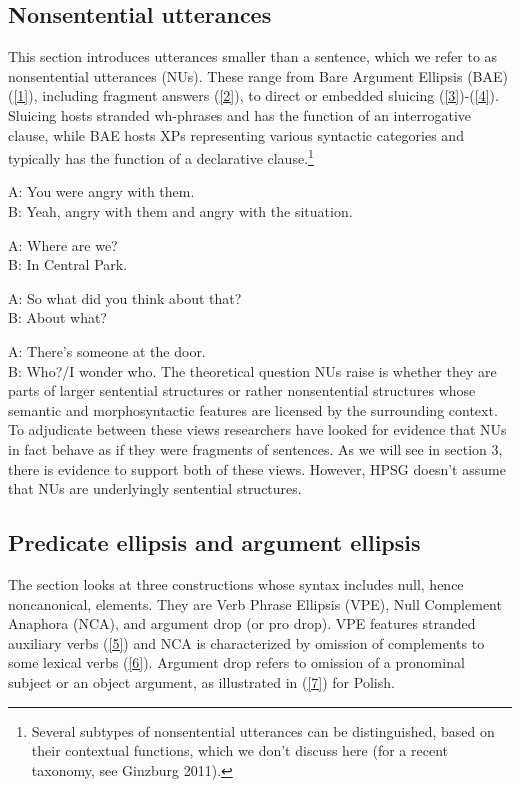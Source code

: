 \documentclass[output=paper
                ,modfonts
                ,nonflat
	        ,collection
	        ,collectionchapter
	        ,collectiontoclongg
 	        ,biblatex
                ,babelshorthands
                ,newtxmath
                ,draftmode
                ,colorlinks, citecolor=brown
]{./langsci/langscibook}
\begin{document}
{\subsection{Nonsentential utterances}
This section introduces utterances smaller than a sentence, which we refer to as nonsentential utterances (NUs). These range from Bare Argument Ellipsis (BAE) (\ref{1}), including fragment answers (\ref{2}), to direct or embedded sluicing (\ref{3})-(\ref{4}). Sluicing hosts stranded wh-phrases and has the function of an interrogative clause, while BAE hosts XPs representing various syntactic categories and typically has the function of a declarative clause.\footnote{Several subtypes of nonsentential utterances can be distinguished, based on their contextual functions, which we don't discuss here (for a recent taxonomy, see Ginzburg 2011).}



\ea A: You were angry with them.\\ B: Yeah, angry with them and angry with the situation.\label{1}\z

\ea A: Where are we? \\B: In Central Park.\label{2}\z

\ea A: So what did you think about that?\\ B: About what? \label{3}\z

\ea A: There's someone at the door. \\B: Who?/I wonder who. \label{4}\z
The theoretical question NUs raise is whether they are parts of larger sentential structures or rather nonsentential structures whose semantic and morphosyntactic features are licensed by the surrounding context. To adjudicate between these views researchers have looked for evidence that NUs in fact behave as if they were fragments of sentences. As we will see in section 3, there is evidence to support both of these views. However, HPSG doesn't assume that NUs are underlyingly sentential structures.

\subsection{Predicate ellipsis and argument ellipsis}
The section looks at three constructions whose syntax includes null, hence noncanonical, elements. They are Verb Phrase Ellipsis (VPE), Null Complement Anaphora (NCA), and argument drop (or pro drop). VPE features stranded auxiliary verbs (\ref{5}) and NCA is characterized by omission of complements to some lexical verbs (\ref{6}). Argument drop refers to omission of a pronominal subject or an object argument, as illustrated in (\ref{7}) for Polish.

}
\end{document}
